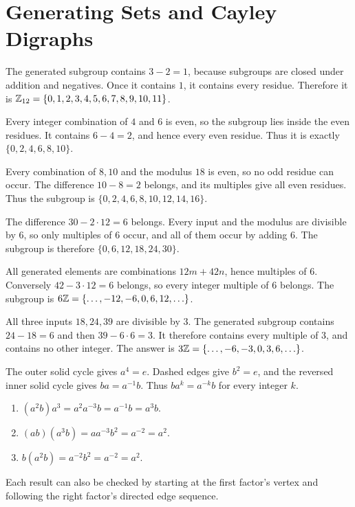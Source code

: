 \section{Generating Sets and Cayley Digraphs}


The generated subgroup contains $3-2=1$, because subgroups are closed under addition and negatives. Once it contains $1$, it contains every residue. Therefore it is $\mathbb{Z}_{12}=\{0,1,2,3,4,5,6,7,8,9,10,11\}$.


Every integer combination of $4$ and $6$ is even, so the subgroup lies inside the even residues. It contains $6-4=2$, and hence every even residue. Thus it is exactly $\{0,2,4,6,8,10\}$.


Every combination of $8,10$ and the modulus $18$ is even, so no odd residue can occur. The difference $10-8=2$ belongs, and its multiples give all even residues. Thus the subgroup is $\{0,2,4,6,8,10,12,14,16\}$.


The difference $30-2\cdot12=6$ belongs. Every input and the modulus are divisible by $6$, so only multiples of $6$ occur, and all of them occur by adding $6$. The subgroup is therefore $\{0,6,12,18,24,30\}$.


All generated elements are combinations $12m+42n$, hence multiples of $6$. Conversely $42-3\cdot12=6$ belongs, so every integer multiple of $6$ belongs. The subgroup is $6\mathbb{Z}=\{\ldots,-12,-6,0,6,12,\ldots\}$.


All three inputs $18,24,39$ are divisible by $3$. The generated subgroup contains $24-18=6$ and then $39-6\cdot6=3$. It therefore contains every multiple of $3$, and contains no other integer. The answer is $3\mathbb{Z}=\{\ldots,-6,-3,0,3,6,\ldots\}$.


The outer solid cycle gives $a^4=e$. Dashed edges give $b^2=e$, and the reversed inner solid cycle gives $ba=a^{-1}b$. Thus $ba^k=a^{-k}b$ for every integer $k$.
\begin{enumerate}[label=(\alph*)]
\item $(a^2b)a^3=a^2a^{-3}b=a^{-1}b=a^3b$.
\item $(ab)(a^3b)=aa^{-3}b^2=a^{-2}=a^2$.
\item $b(a^2b)=a^{-2}b^2=a^{-2}=a^2$.
\end{enumerate}
Each result can also be checked by starting at the first factor's vertex and following the right factor's directed edge sequence.

